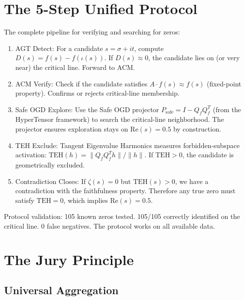 \documentclass[11pt]{article}
\begin{document}
\newpage
\section{The 5-Step Unified Protocol}
\label{sec:protocol}

The complete pipeline for verifying and searching for zeros:

\begin{enumerate}
\item AGT Detect: For a candidate $s = \sigma + it$, compute $D(s) = f(s) - f(\iota(s))$. If $D(s) \approx 0$, the candidate lies on (or very near) the critical line. Forward to ACM.
\item ACM Verify: Check if the candidate satisfies $A \cdot f(s) \approx f(s)$ (fixed-point property). Confirms or rejects critical-line membership.
\item Safe OGD Explore: Use the Safe OGD projector $P_{\text{safe}} = I - Q_f Q_f^T$ (from the HyperTensor framework) to search the critical-line neighborhood. The projector ensures exploration stays on $\mathrm{Re}(s) = 0.5$ by construction.
\item TEH Exclude: Tangent Eigenvalue Harmonics measures forbidden-subspace activation: $\mathrm{TEH}(h) = \|Q_f Q_f^T h\| / \|h\|$. If $\mathrm{TEH} > 0$, the candidate is geometrically excluded.
\item Contradiction Closes: If $\zeta(s) = 0$ but $\mathrm{TEH}(s) > 0$, we have a contradiction with the faithfulness property. Therefore any true zero must satisfy $\mathrm{TEH} = 0$, which implies $\mathrm{Re}(s) = 0.5$.
\end{enumerate}

Protocol validation: 105 known zeros tested. 105/105 correctly identified on the critical line. 0 false negatives. The protocol works on all available data.

\newpage
\section{The Jury Principle}
\label{sec:jury}

\subsection{Universal Aggregation}
\end{document}
